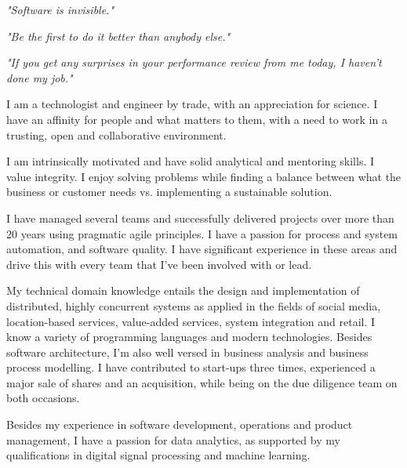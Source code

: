 \documentclass[10pt,a4paper,final]{columncv}
\begin{document}
\vfill

\begin{center}
  {\textit{"Software is invisible."}}
\end{center}
\begin{center}
  {\textit{"Be the first to do it better than anybody else."}}
\end{center}
\begin{center}
  {\textit{"If you get any surprises in your performance review from me today, I haven't done my job."}}
\end{center}

\pagebreak



I am a technologist and engineer by trade, with an appreciation for science. I have 
an affinity for people and what matters to them, with a need to work in a trusting, open 
and collaborative environment. 

I am intrinsically motivated and have solid analytical and mentoring skills. I value integrity. 
I enjoy solving problems while finding a balance between what the business or customer 
needs vs. implementing a sustainable solution. 

I have managed several teams and successfully delivered projects over more than 20 years
using pragmatic agile principles. I have a passion for process and system automation, and 
software quality. I have significant experience in these areas and drive this with every team 
that I've been involved with or lead. 

My technical domain knowledge entails the design and implementation of distributed, highly 
concurrent systems as applied in the fields of social media, location-based services, value-added 
services, system integration and retail. I know a variety of programming languages and modern 
technologies. Besides software architecture, I'm also well versed in business analysis and 
business process modelling. I have contributed to start-ups three times, experienced a major sale 
of shares and an acquisition, while being on the due diligence team on both occasions. 

Besides my experience in software development, operations and product management, I have 
a passion for data analytics, as supported by my qualifications in digital signal processing and 
machine learning. 
\end{document}
